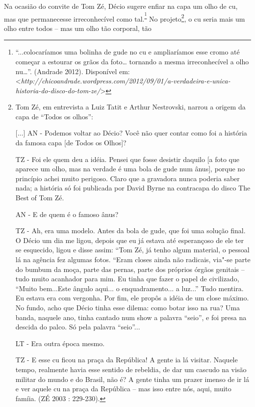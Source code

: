Na ocasião do convite de Tom Zé, Décio sugere enfiar na capa um olho de
cu, mas que permanecesse irreconhecível como
tal.\textsuperscript{\footnote{``...colocaríamos uma bolinha de gude no
  cu e ampliaríamos esse cromo até começar a estourar os grãos da
  foto\ldots{} tornando a mesma irreconhecível a olho nu\ldots{}''.
  (Andrade 2012). Disponível em:
  \textless{}{\emph{http://chicoandrade.wordpress.com/2012/09/01/a-verdadeira-e-unica-historia-do-disco-do-tom-ze/}}\textgreater{}}}
No projeto\footnote{Tom Zé, em entrevista a Luiz Tatit
  e Arthur Nestrovski, narrou a origem da capa de ``Todos os olhos'':

  {[}...{]} AN - Podemos voltar ao Décio? Você não quer contar como foi
  a história da famosa capa {[}de Todos os Olhos{]}?

  TZ - Foi ele quem deu a idéia. Pensei que fosse desistir daquilo {[}a
  foto que aparece um olho, mas na verdade é uma bola de gude num
  ânus{]}, porque no princípio achei muito perigoso. Claro que a
  gravadora nunca poderia saber nada; a história só foi publicada por
  David Byrne na contracapa do disco The Best of Tom Zé.

  AN - E de quem é o famoso ânus?

  TZ - Ah, era uma modelo. Antes da bola de gude, que foi uma solução
  final. O Décio um dia me ligou, depois que eu já estava até
  esperançoso de ele ter se esquecido, ligou e disse assim: ``Tom Zé, já
  tenho algum material, o pessoal lá na agência fez algumas fotos.
  ``Eram closes ainda não radicais, via"-se parte do bumbum da moça,
  parte das pernas, parte dos próprios órgãos genitais -- tudo muito
  acanhador para mim. Eu tinha que fazer o papel de civilizado, ``Muito
  bem...Este ângulo aqui... o enquadramento... a luz...'' Tudo mentira.
  Eu estava era com vergonha. Por fim, ele propôs a idéia de um close
  máximo. No fundo, acho que Décio tinha esse dilema: como botar isso na
  rua? Uma banda, naquele ano, tinha cantado num show a palavra
  ``seio'', e foi presa na descida do palco. Só pela palavra ``seio''...

  LT - Era outra época mesmo.

  TZ - E esse cu ficou na praça da República! A gente ia lá visitar.
  Naquele tempo, realmente havia esse sentido de rebeldia, de dar um
  cascudo na visão militar do mundo e do Brasil, não é? A gente tinha um
  prazer imenso de ir lá e ver aquele cu na praça da República -- mas
  isso entre nós, aqui, muito famíia. (ZÉ 2003 : 229-230).}, o cu
seria mais um olho entre todos -- mas um olho tão corporal, tão
